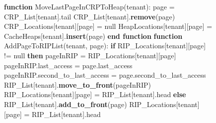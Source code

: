 \begin{figure}[htbp]
    \centering
    \begin{minipage}{\linewidth}
    \begin{algorithm}[H]
        \begin{algorithmic}
            \STATE \textbf{function} MoveLastPageInCRPToHeap(tenant):
            \STATE \hspace{\algorithmicindent} page = CRP\_List[tenant].tail
            \STATE \hspace{\algorithmicindent} CRP\_List[tenant].\textbf{remove}(page)
            \STATE \hspace{\algorithmicindent} CRP\_Locations[tenant][page] = null
            \STATE \hspace{\algorithmicindent} HeapLocations[tenant][page] = CacheHeaps[tenant].\textbf{insert}(page)
            \STATE \textbf{end function}
            \STATE
            \STATE \textbf{function} AddPageToRIPList(tenant, page):
            \STATE \hspace{\algorithmicindent} \textbf{if} RIP\_Locations[tenant][page] != null \textbf{then}
            \STATE \hspace{\algorithmicindent} \hspace{\algorithmicindent} pageInRIP = RIP\_Locations[tenant][page]
            \STATE \hspace{\algorithmicindent} \hspace{\algorithmicindent} pageInRIP.last\_access = page.last\_access
            \STATE \hspace{\algorithmicindent} \hspace{\algorithmicindent} pageInRIP.second\_to\_last\_access = page.second\_to\_last\_access
            \STATE \hspace{\algorithmicindent} \hspace{\algorithmicindent} RIP\_List[tenant].\textbf{move\_to\_front}(pageInRIP)
            \STATE \hspace{\algorithmicindent} \hspace{\algorithmicindent} RIP\_Locations[tenant][page] = RIP\_List[tenant].head
            \STATE \hspace{\algorithmicindent} \textbf{else}
            \STATE \hspace{\algorithmicindent} \hspace{\algorithmicindent} RIP\_List[tenant].\textbf{add\_to\_front}(page)
            \STATE \hspace{\algorithmicindent} \hspace{\algorithmicindent} RIP\_Locations[tenant][page] = RIP\_List[tenant].head

\end{algorithmic}
\end{algorithm}
\end{minipage}
\end{figure}
